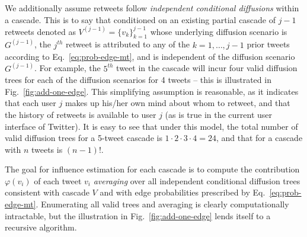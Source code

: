 
We additionally assume retweets follow {\em independent conditional diffusions} within a cascade. 
This is to say that conditioned on an existing partial cascade of $j-1$ retweets denoted as $V^{(j-1)}=\{v_k\}_{k=1}^{j-1}$ whose underlying diffusion scenario is $G^{(j-1)}$, the $j^{th}$ retweet is attributed to any of the $k=1,\ldots,j-1$ prior tweets according to Eq.~\ref{eq:prob-edge-mt}, and is independent of the diffusion scenario $G^{(j-1)}$. 
For example, the $5^{th}$ tweet in the cascade will incur four valid diffusion trees for each of the diffusion scenarios for 4 tweets -- this is illustrated in Fig.~\ref{fig:add-one-edge}. 
This simplifying assumption is reasonable, as it indicates that each user $j$ makes up his/her own mind about whom to retweet, and that the history of retweets is available to user $j$ (as is true in the current user interface of Twitter).
It is easy to see that under this model, the total number of valid diffusion trees for a 5-tweet cascade is $1\cdot 2\cdot 3\cdot 4=24$, and that for a cascade with $n$ tweets is $(n-1)!$.

The goal for influence estimation for each cascade is to compute the contribution $\varphi(v_i)$ of each tweet $v_i$ {\em averaging} over all independent conditional diffusion trees consistent with cascade $V$ and with edge probabilities prescribed by Eq.~\ref{eq:prob-edge-mt}. 
Enumerating all valid trees and averaging is clearly computationally intractable, but the illustration in Fig.~\ref{fig:add-one-edge} lends itself to a recursive algorithm. 

